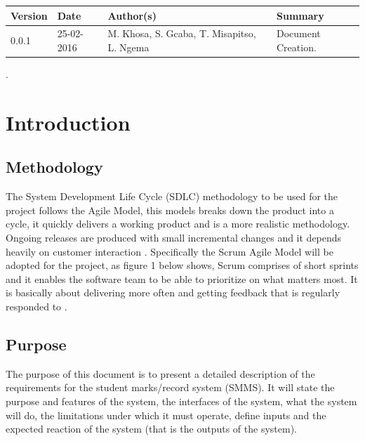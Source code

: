 \documentclass[10pt,onecolumn]{RequimentsGathering}
\begin{document}
\begin{center}
    \begin{tabular}{ | p{2cm} | p{3cm} | p{5cm} | p{5cm} |}
    \hline
    \textbf{Version}& \textbf{Date}& \textbf{Author(s)} & \textbf{Summary} \\ \hline
    0.0.1 & 25-02-2016 & M.$\;$Khosa, S.$\;$Gcaba, T.$\;$Misapitso, L.$\;$Ngema& Document Creation. \\ \hline

    \end{tabular}
\end{center}

\newpage


%
\pagestyle{plain}.
\section{Introduction}

\subsection{Methodology}

The System Development Life Cycle (SDLC) methodology to be used for the project follows the Agile Model, this models breaks down the product into a cycle, it quickly delivers a working product and is a more realistic methodology. Ongoing releases are produced with small incremental changes and it depends heavily on customer interaction \cite{ref7}. Specifically the Scrum Agile Model will be adopted for the project, as figure 1 below shows, Scrum comprises of short sprints and it enables the software team to be able to prioritize on what matters most. It is basically about delivering more often and getting feedback that is regularly responded to \cite{ref8}.           

\subsection{Purpose}

The purpose of this document is to present a detailed description of the requirements for the student marks/record system (SMMS). It will state the purpose and features of the system, the interfaces of the system, what the system will do, the limitations under which it must operate, define inputs and the expected reaction of the system (that is the outputs of the system). 
\end{document}
